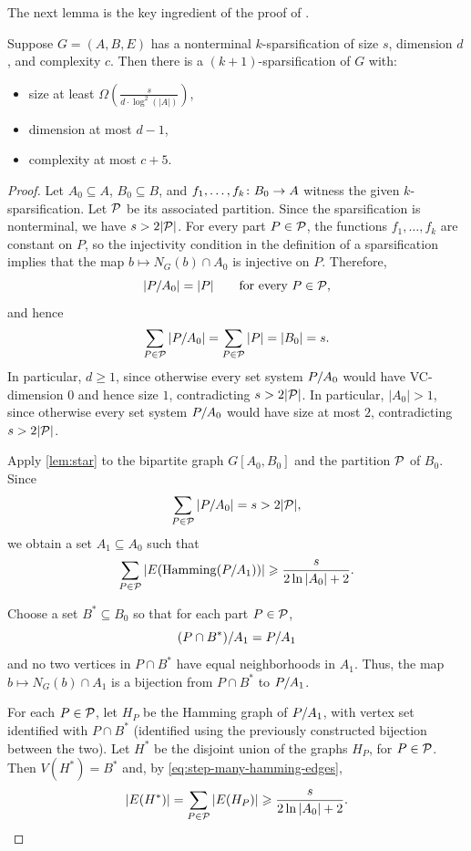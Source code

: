 The next lemma is the key ingredient of the proof of .
\begin{lemma}\label{lem:step}
  Suppose $G=(A,B,E)$ has a nonterminal $k$-sparsification of size $s$,
  dimension $d$, and complexity $c$.
  Then there is a $(k+1)$-sparsification of $G$ with:
  \begin{itemize}
    \item size at least $\Omega(\frac{s}{d\cdot \log^2(|A|)})$,
    \item dimension at most $d-1$,
    \item complexity at most $c+5$.
  \end{itemize}
\end{lemma}
\begin{proof}
Let $A_0\subseteq A$, $B_0\subseteq B$, and $f_1,\ldots,f_k\from B_0\to A$
witness the given $k$-sparsification.
Let $\cal P$ be its associated partition.
Since the sparsification is nonterminal, we have $s>2|\cal P|$.
For every part $P\in\cal P$, the functions $f_1,\ldots,f_k$ are constant on $P$,
so the injectivity condition in the definition of a sparsification implies that
the map $b\mapsto N_G(b)\cap A_0$ is injective on $P$.
Therefore,
\[
  |\inducedSS{P}{A_0}|=|P|
  \qquad\text{for every }P\in\cal P,
\]
and hence
\[
  \sum_{P\in\cal P}|\inducedSS{P}{A_0}|=\sum_{P\in\cal P}|P|=|B_0|=s.
\]
In particular, $d\ge 1$, since otherwise every set system $\inducedSS{P}{A_0}$
would have VC-dimension $0$ and hence size $1$, contradicting
$s>2|\cal P|$.
In particular, $|A_0|>1$, since otherwise every set system $\inducedSS{P}{A_0}$
would have size at most $2$, contradicting $s>2|\cal P|$.

Apply \cref{lem:star} to the bipartite graph $G[A_0,B_0]$ and the partition
$\cal P$ of $B_0$. Since
\[
  \sum_{P\in\cal P}|\inducedSS{P}{A_0}|=s>2|\cal P|,
\]
we obtain a set $A_1\subseteq A_0$ such that
\begin{equation}\label{eq:step-many-hamming-edges}
  \sum_{P\in\cal P}|E(\hamming(\inducedSS{P}{A_1}))|
  \ge \frac{s}{2\ln |A_0|+2}.
\end{equation}

Choose a set $B^*\subseteq B_0$ so that for each part $P\in\cal P$,
\[
  \inducedSS{(P\cap B^*)}{A_1}=\inducedSS{P}{A_1}
\]
and no two vertices in $P\cap B^*$ have equal neighborhoods in $A_1$.
Thus, the map $b\mapsto N_G(b)\cap A_1$ is a bijection from $P\cap B^*$ to
$\inducedSS{P}{A_1}$.

For each $P\in\cal P$, let $H_P$ be the Hamming graph of
$\inducedSS{P}{A_1}$, with vertex set identified with $P\cap B^*$ (identified using the previously constructed bijection between the two).
Let $H^*$ be the disjoint union of the graphs $H_P$, for $P\in\cal P$.
Then $V(H^*)=B^*$ and, by \eqref{eq:step-many-hamming-edges},
\[
  |E(H^*)|
  =\sum_{P\in\cal P}|E(H_P)|
  \ge \frac{s}{2\ln |A_0|+2}.
\]


\end{proof}
